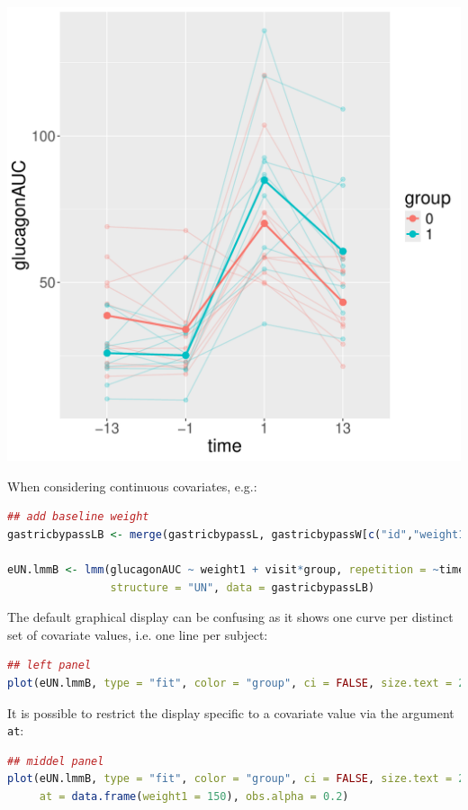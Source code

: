 \documentclass[12pt]{article}
\begin{document}
\begin{minipage}{0.3\linewidth}
\begin{center}
\includegraphics[width=\textwidth]{./figures/fitAll-autoplot.pdf}
\end{center}
\end{minipage}


When considering continuous covariates, e.g.:
\begin{lstlisting}[language=r,numbers=none]
## add baseline weight
gastricbypassLB <- merge(gastricbypassL, gastricbypassW[c("id","weight1")], by = "id")

eUN.lmmB <- lmm(glucagonAUC ~ weight1 + visit*group, repetition = ~time|id,
                structure = "UN", data = gastricbypassLB)
\end{lstlisting}


\noindent The default graphical display can be confusing as it shows
one curve per distinct set of covariate values, i.e. one line per
subject:
\begin{lstlisting}[language=r,numbers=none]
## left panel
plot(eUN.lmmB, type = "fit", color = "group", ci = FALSE, size.text = 20)
\end{lstlisting}

It is possible to restrict the display specific to a covariate value
via the argument \texttt{at}:
\begin{lstlisting}[language=r,numbers=none]
## middel panel
plot(eUN.lmmB, type = "fit", color = "group", ci = FALSE, size.text = 20,
     at = data.frame(weight1 = 150), obs.alpha = 0.2)
\end{lstlisting}
\end{document}
